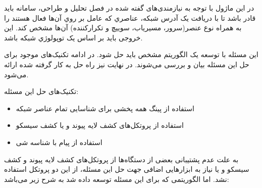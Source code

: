 در این ماژول با توجه به نیازمندی‌های گفته شده در فصل تحلیل و طراحی، سامانه باید قادر باشد تا با دریافت یک آدرس شبکه، عناصري که عامل  بر روي آن‌ها فعال هستند را به همراه نوع عنصر(سرور، مسیریاب، سوییچ و تکرارکننده) آن‌ها مشخص کند. این خروجی باید بر اساس یک توپولوژي شبکه باشد.


این مسئله با توسعه یک الگوریتم مشخص باید حل شود. در ادامه تکنیک‌های موجود برای حل این مسئله بیان و بررسی می‌شوند. در نهایت نیز راه حل به کار گرفته شده ارائه می‌شود.

تکنیک‌های حل این مسئله:

\begin{itemize}
    \item استفاده از پینگ همه پخشی برای شناسایی تمام عناصر شبکه
    \item استفاده از پروتکل‌های کشف لایه پیوند و یا کشف سیسکو
    \item استفاده از پیام  با شناسه شی 
\end{itemize}

به علت عدم پشتیبانی بعضی از دستگاه‌ها از پروتکل‌های کشف لایه پیوند و کشف سیسکو و یا نیاز به ابزارهایی اضافی جهت حل این مسئله، از این دو پروتکل استفاده نشد. اما الگوریتمی که برای این مسئله توسعه داده شد به شرح زیر می‌باشد:


